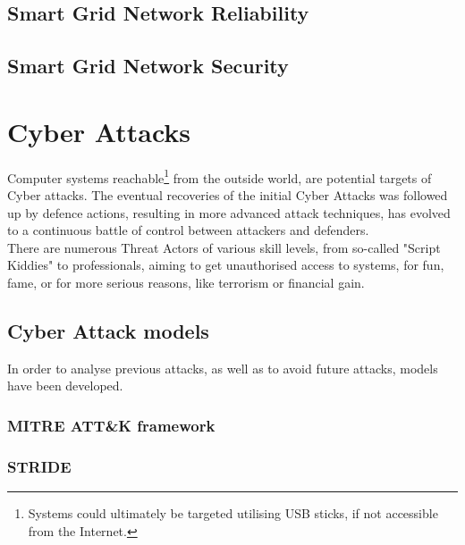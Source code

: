 \subsection{Smart Grid Network Reliability}

\subsection{Smart Grid Network Security}


    
\section{Cyber Attacks}



Computer systems reachable\footnote{Systems could ultimately be targeted utilising USB sticks, if not accessible from the Internet.} from the outside world,  are potential targets of Cyber attacks. The eventual recoveries of the initial Cyber Attacks was followed up by defence actions, resulting in more advanced attack techniques, has evolved to a continuous battle of control between attackers and defenders. \\


There are numerous Threat Actors of various skill levels, from so-called "Script Kiddies" to professionals, aiming to get unauthorised access to systems, for fun, fame, or for more serious reasons, like terrorism or financial gain. 





\subsection{Cyber Attack models}

In order to analyse previous attacks, as well as to avoid future attacks, models have been developed. 

\Cite{straub2020modeling}

 \subsubsection{MITRE ATT\&K framework}
 
 
 \Cite{strom2018mitre}
\subsubsection{STRIDE}

